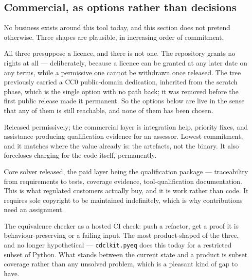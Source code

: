 \documentclass[11pt,a4paper]{article}
\begin{document}
\subsection*{Commercial, as options rather than decisions}

No business exists around this tool today, and this section does not pretend
otherwise. Three shapes are plausible, in increasing order of commitment.

All three presuppose a licence, and there is not one. The repository grants no
rights at all --- deliberately, because a licence can be granted at any later
date on any terms, while a permissive one cannot be withdrawn once released.
The tree previously carried a CC0 public-domain dedication, inherited from the
scratch phase, which is the single option with no path back; it was removed
before the first public release made it permanent. So the options below are
live in the sense that any of them is still reachable, and none of them has
been chosen.

\begin{description}[leftmargin=1.4cm,style=nextline]
  \item[Open with support] Released permissively; the commercial layer is
        integration help, priority fixes, and assistance producing
        qualification evidence for an assessor. Lowest commitment, and it
        matches where the value already is: the artefacts, not the binary. It
        also forecloses charging for the code itself, permanently.
  \item[Open core] Core solver released, the paid layer being the
        qualification package --- traceability from requirements to tests,
        coverage evidence, tool-qualification documentation. This is what
        regulated customers actually buy, and it is work rather than code. It
        requires sole copyright to be maintained indefinitely, which is why
        contributions need an assignment.
  \item[Verification as a service] The equivalence checker as a hosted CI
        check: push a refactor, get a proof it is behaviour-preserving or a
        failing input. The most product-shaped of the three, and no longer
        hypothetical --- \texttt{cdclkit.pyeq} does this today for a restricted
        subset of Python. What stands between the current state and a product
        is subset coverage rather than any unsolved problem, which is a
        pleasant kind of gap to have.
\end{description}
\end{document}
